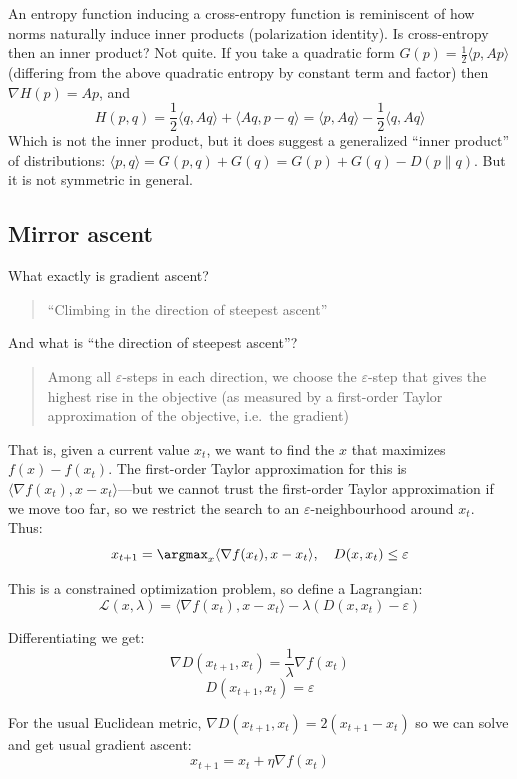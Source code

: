 An entropy function inducing a cross-entropy function is reminiscent of how norms naturally
induce inner products (polarization identity). Is cross-entropy then an inner product? Not
quite. If you take a quadratic form $G(p)=\frac12 \langle p, A p\rangle$ (differing from
the above quadratic entropy by constant term and factor) then $\nabla H(p)=Ap$, and
\[H(p,q)= \frac12 \langle q, A q\rangle+\langle Aq, p-q\rangle=\langle p,Aq\rangle-\frac12 \langle q,Aq\rangle\]
Which is not the inner product, but it does suggest a generalized ``inner product'' of
distributions: $\langle p, q\rangle =G(p,q)+G(q)=G(p)+G(q)-D(p\parallel q)$. But it is not
symmetric in general.

\subsection{Mirror ascent}\label{agency:sec:mirror}

What exactly is gradient ascent?
\begin{quote}
``Climbing in the direction of steepest ascent''
\end{quote}
And what is ``the direction of steepest ascent''?
\begin{quote}
Among all $\varepsilon$-steps in each direction, we choose the $\varepsilon$-step that gives
the highest rise in the objective (as measured by a first-order Taylor approximation of the
objective, i.e.\ the gradient)
\end{quote}

That is, given a current value $x_t$, we want to find the $x$ that maximizes $f(x)-f(x_t)$. The
first-order Taylor approximation for this is $\langle\nabla f(x_t), x-x_t\rangle$---but we
cannot trust the first-order Taylor approximation if we move too far, so we restrict the
search to an $\varepsilon$-neighbourhood around $x_t$. Thus:
\[x_{t+1}=\argmax_x \langle\nabla f(x_t), x-x_t\rangle, \quad D(x, x_t)\le\varepsilon\]

This is a constrained optimization problem, so define a Lagrangian:
\[\mathcal{L}(x,\lambda)= \langle\nabla f(x_t), x-x_t\rangle - \lambda (D(x, x_t)-\varepsilon)\]

Differentiating we get:
\begin{equation}
\nabla D(x_{t+1}, x_t) = \frac1\lambda \nabla f(x_t) \label{agency:eq:md-foc}
\end{equation}
\[D(x_{t+1}, x_t)=\varepsilon\]

For the usual Euclidean metric, $\nabla D(x_{t+1}, x_t) = 2(x_{t+1}-x_t)$ so we can solve
and get usual gradient ascent:
\[x_{t+1} = x_t + \eta \nabla f(x_t)\]

